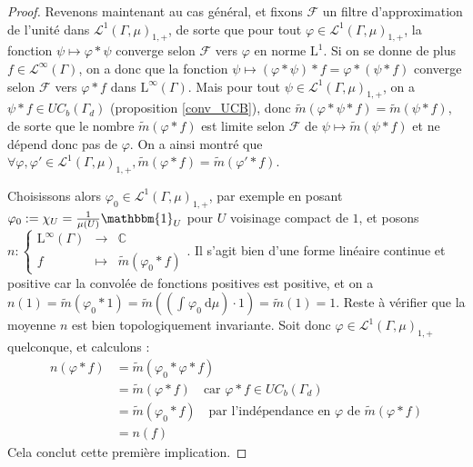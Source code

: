 \documentclass[a4paper,12pt]{article}
\newcommand{\C}{\mathbb{C}}
\newcommand{\indic}{\mathbbm{1}}
\newcommand{\integral}[4]{\int_{#1}^{#2} #3~\mathrm{d}#4}
\newcommand\fundef[3]{#1: \left\{\begin{array}{ccc}#2\\#3\end{array}\right.}
\begin{document}
\begin{proof}
    Revenons maintenant au cas général, et fixons $\mathscr{F}$ un filtre d'approximation de l'unité 
    dans $\mathscr{L}^1(\Gamma, \mu)_{1, +}$, de sorte que pour tout $\varphi\in\mathscr{L}^1(\Gamma, \mu)_{1, +}$, la fonction 
    $\psi\mapsto\varphi\ast\psi$ converge selon $\mathscr{F}$ vers $\varphi$ en norme $\mathrm{L}^1$. 
    Si on se donne de plus $f\in\mathscr{L}^\infty(\Gamma)$, on a donc que la fonction $\psi\mapsto(\varphi\ast\psi)\ast f = \varphi\ast(\psi\ast f)$
    converge selon $\mathscr{F}$ vers $\varphi\ast f$ dans $\mathrm{L}^\infty(\Gamma)$. Mais pour tout $\psi\in\mathscr{L}^1(\Gamma, \mu)_{1, +}$, on
    a $\psi\ast f\in UC_b(\Gamma_d)$ (proposition \ref{conv_UCB}), donc $\widetilde{m}(\varphi\ast\psi\ast f) = \widetilde{m}(\psi\ast f)$,
    de sorte que le nombre $\widetilde{m}(\varphi\ast f)$ est limite selon $\mathscr{F}$ de $\psi\mapsto\widetilde{m}(\psi\ast f)$ et 
    ne dépend donc pas de $\varphi$. On a ainsi montré que $\forall\varphi, \varphi'\in\mathscr{L}^1(\Gamma, \mu)_{1, +}, \widetilde{m}(\varphi\ast f) = \widetilde{m}(\varphi'\ast f)$.

    Choisissons alors $\varphi_0\in\mathscr{L}^1(\Gamma, \mu)_{1, +}$, par exemple en posant $\varphi_0:=\chi_U=\frac{1}{\mu(U)}\indic_U$ pour 
    $U$ voisinage compact de $1$, et posons $\fundef{n}{\mathrm{L}^\infty(\Gamma)&\to&\C}{f&\mapsto&\widetilde{m}(\varphi_0\ast f)}$. Il s'agit bien d'une 
    forme linéaire continue et positive car la convolée de fonctions positives est positive, et on a $n(1)=\widetilde{m}(\varphi_0\ast 1) = \widetilde{m}\left(\left(\integral{}{}{\varphi_0}{\mu}\right)\cdot 1\right) = \widetilde{m}(1) = 1$.
    Reste à vérifier que la moyenne $n$ est bien topologiquement invariante. Soit donc $\varphi\in\mathscr{L}^1(\Gamma, \mu)_{1, +}$ quelconque, et calculons :
    \begin{align*}
        n(\varphi\ast f) 
            &= \widetilde{m}(\varphi_0\ast\varphi\ast f) \\
            &= \widetilde{m}(\varphi\ast f) \quad\text{car } \varphi\ast f\in UC_b(\Gamma_d)\\
            &= \widetilde{m}(\varphi_0\ast f) \quad\text{par l'indépendance en $\varphi$ de $\widetilde{m}(\varphi\ast f)$} \\
            &= n(f)
    \end{align*}
    Cela conclut cette première implication. 


\end{proof}
\end{document}
